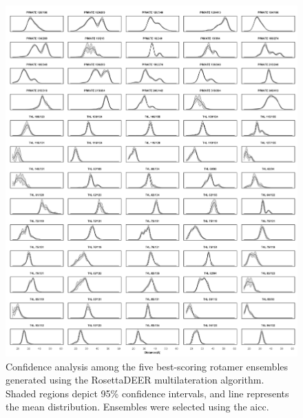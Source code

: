 \begin{figure}[h]
\centering
\includegraphics[width=6in]{Figures/multilateration_supp_conf_bands.pdf}
\caption[Confidence analysis among the five best-scoring rotamer ensembles generated using the RosettaDEER multilateration algorithm. ]{Confidence analysis among the five best-scoring rotamer ensembles generated using the RosettaDEER multilateration algorithm. Shaded regions depict 95\% confidence intervals, and line represents the mean distribution. Ensembles were selected using the \gls{aicc}.}
\label{fig:multilateration_supp_conf_bands}
\end{figure}

